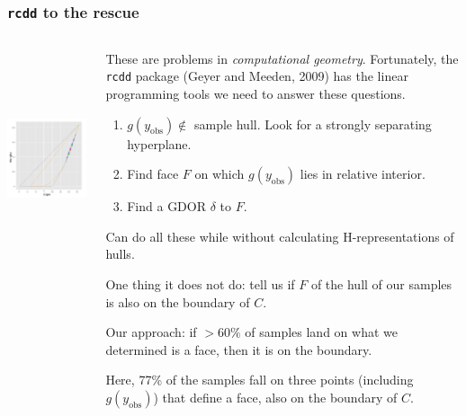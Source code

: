 \documentclass[slidestop,compress, 10pt]{beamer}
\newcommand{\yobs}{y_{\text{obs}}}
\begin{document}
\frame
{
\frametitle{\texttt{rcdd} to the rescue}  
\begin{columns}[T]
\begin{column}[T]{0.25\textwidth}
\includegraphics[height=2.5in,trim=3.5in 2in 0.15in 0.05in,clip=true]{MCsample-77face} %
\end{column}
\begin{column}[T]{0.75		\textwidth}
These are problems in \emph{computational geometry}.  Fortunately, 
the \texttt{rcdd} package (Geyer and Meeden, 2009) has the linear programming 
tools we need to answer these questions.
\vspace{2mm}

\begin{enumerate}
\item $g(\yobs) \notin$ sample hull.  Look for a strongly separating hyperplane.
\item Find face $F$ on which $g(\yobs)$ lies in relative interior.
\item Find a GDOR $\delta$ to $F$.
\end{enumerate}
Can do all these while without calculating H-representations of hulls.


One thing it does not do: tell us if $F$ of the hull of our samples is also
on the boundary of $C$.  
\vspace{2mm}

Our approach: if $>60\%$ of samples land on what we determined is a face, then it is on the boundary.
\vspace{2mm}

Here, 77\% of the samples fall on three points (including $g(\yobs)$) that define a face, also on the boundary of $C$.
\end{column}
\end{columns}
}
\end{document}
